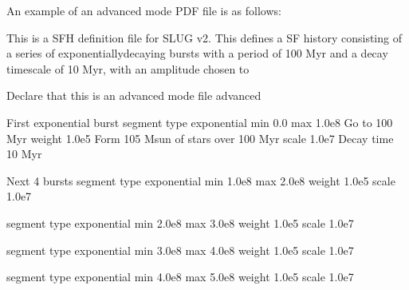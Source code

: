 \documentclass[letterpaper,10pt,english]{sphinxmanual}
\begin{document}
An example of an advanced mode PDF file is as follows:

\begin{sphinxVerbatim}[commandchars=\\\{\}]
\PYGZsh{}\PYGZsh{}\PYGZsh{}\PYGZsh{}\PYGZsh{}\PYGZsh{}\PYGZsh{}\PYGZsh{}\PYGZsh{}\PYGZsh{}\PYGZsh{}\PYGZsh{}\PYGZsh{}\PYGZsh{}\PYGZsh{}\PYGZsh{}\PYGZsh{}\PYGZsh{}\PYGZsh{}\PYGZsh{}\PYGZsh{}\PYGZsh{}\PYGZsh{}\PYGZsh{}\PYGZsh{}\PYGZsh{}\PYGZsh{}\PYGZsh{}\PYGZsh{}\PYGZsh{}\PYGZsh{}\PYGZsh{}\PYGZsh{}\PYGZsh{}\PYGZsh{}\PYGZsh{}\PYGZsh{}\PYGZsh{}\PYGZsh{}\PYGZsh{}\PYGZsh{}\PYGZsh{}\PYGZsh{}\PYGZsh{}\PYGZsh{}\PYGZsh{}\PYGZsh{}\PYGZsh{}\PYGZsh{}\PYGZsh{}\PYGZsh{}\PYGZsh{}\PYGZsh{}\PYGZsh{}\PYGZsh{}\PYGZsh{}\PYGZsh{}\PYGZsh{}\PYGZsh{}\PYGZsh{}\PYGZsh{}\PYGZsh{}\PYGZsh{}
\PYGZsh{} This is a SFH definition file for SLUG v2.
\PYGZsh{} This defines a SF history consisting of a series of
\PYGZsh{} exponentially\PYGZhy{}decaying bursts with a period of 100 Myr and
\PYGZsh{} a decay timescale of 10 Myr, with an amplitude chosen to

\PYGZsh{} Declare that this is an advanced mode file
advanced

\PYGZsh{} First exponential burst
segment
type exponential
min      0.0
max      1.0e8         \PYGZsh{} Go to 100 Myr
weight   1.0e5         \PYGZsh{} Form 10\PYGZca{}5 Msun of stars over 100 Myr
scale    1.0e7         \PYGZsh{} Decay time 10 Myr

\PYGZsh{} Next 4 bursts
segment
type exponential
min      1.0e8
max      2.0e8
weight   1.0e5
scale    1.0e7

segment
type exponential
min      2.0e8
max      3.0e8
weight   1.0e5
scale    1.0e7

segment
type exponential
min      3.0e8
max      4.0e8
weight   1.0e5
scale    1.0e7

segment
type exponential
min      4.0e8
max      5.0e8
weight   1.0e5
scale    1.0e7
\end{sphinxVerbatim}
\end{document}
